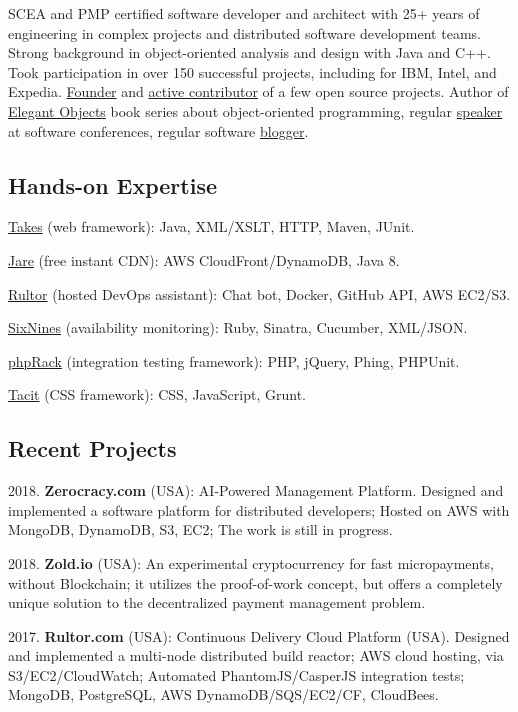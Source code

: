 \documentclass[12pt]{article}
\begin{document}
SCEA and PMP certified software developer and architect with
25+ years of engineering in complex projects and distributed software
development teams. Strong background in object-oriented analysis and design
with Java and C++. Took participation in over 150 successful projects,
including for IBM, Intel, and Expedia. \href{https://www.yegor256.com/pets.html}{Founder}
and \href{https://github.com/yegor256}{active contributor} of
a few open source projects. Author of
\href{https://www.yegor256.com/elegant-objects.html}{Elegant Objects}
book series about object-oriented programming,
regular \href{https://www.yegor256.com/talks.html}{speaker} at software conferences, regular software
\href{https://www.yegor256.com}{blogger}.

\subsection*{Hands-on Expertise}

\href{http://www.takes.org}{Takes} (web framework):
Java, XML/XSLT, HTTP, Maven, JUnit.

\href{http://www.jare.io}{Jare} (free instant CDN):
AWS CloudFront/DynamoDB, Java 8.

\href{http://www.rultor.com}{Rultor} (hosted DevOps assistant):
Chat bot, Docker, GitHub API, AWS EC2/S3.

\href{http://www.sixnines.io}{SixNines} (availability monitoring):
Ruby, Sinatra, Cucumber, XML/JSON.

\href{http://www.phprack.com}{phpRack} (integration testing framework):
PHP, jQuery, Phing, PHPUnit.

\href{https://github.com/yegor256/tacit}{Tacit} (CSS framework):
CSS, JavaScript, Grunt.

\subsection*{Recent Projects}

2018. \textbf{Zerocracy.com} (USA): AI-Powered Management Platform.
Designed and implemented a software platform for distributed developers;
Hosted on AWS with MongoDB, DynamoDB, S3, EC2;
The work is still in progress.

2018. \textbf{Zold.io} (USA): An experimental cryptocurrency for
fast micropayments, without Blockchain; it utilizes the proof-of-work
concept, but offers a completely unique solution to the decentralized
payment management problem.

2017. \textbf{Rultor.com} (USA): Continuous Delivery Cloud Platform (USA).
Designed and implemented a multi-node distributed build reactor;
AWS cloud hosting, via S3/EC2/CloudWatch;
Automated PhantomJS/CasperJS integration tests;
MongoDB, PostgreSQL, AWS DynamoDB/SQS/EC2/CF, CloudBees.
\end{document}
